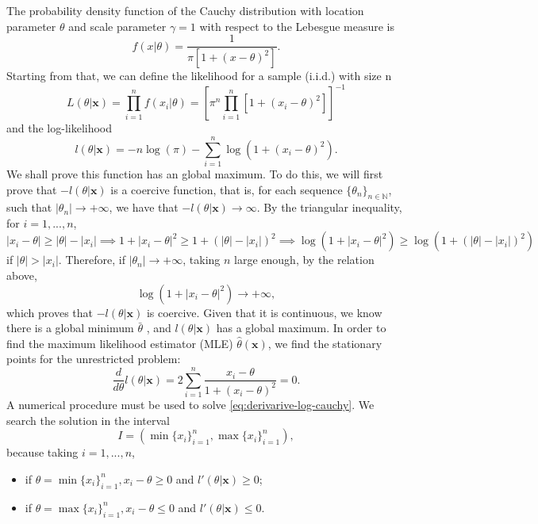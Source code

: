 \documentclass[a4paper,10pt, notitlepage]{report}
\theoremstyle{plain}
\newcommand{\bx}{\boldsymbol{x}} %
\begin{document}
The probability density function of the Cauchy distribution with location
parameter $\theta$ and scale parameter $\gamma=1$ with respect to the Lebesgue
measure is 
    \begin{equation}
        \label{eq:pdf-cauchy}
        f(x|\theta) = \frac{1}{\pi[1 + (x - \theta)^2]}.
    \end{equation} 
    Starting from that, we can define the likelihood for a sample (i.i.d.)
    with size n
    \begin{equation}
        \label{eq:likelihood-cauchy}
        L(\theta|\bx) = \prod_{i=1}^{n} f(x_i|\theta) = \left[\pi^{n}\prod_{i=1}^{n}[1 + (x_i - \theta)^2]\right]^{-1}
    \end{equation}
    and the log-likelihood
    \begin{equation}
        \label{eq:loglikelihood-cauchy}
        l(\theta|\bx) = -n\log(\pi) - \sum_{i=1}^{n}\log\left(1 + (x_i - \theta)^2\right).
    \end{equation}
    We shall prove this function has an global maximum. To do this, we will
    first prove that $-l(\theta|\bx)$ is a coercive function, that is, for each
    sequence $\{\theta_n\}_{n\in\mathbb{N}}$, such that $|\theta_n| \to +
    \infty$, we have that $-l(\theta|\bx) \to \infty$. By the triangular
    inequality, for $i=1,...,n$,
    $$|x_i - \theta| \ge |\theta| - |x_i| \implies 1 + |x_i - \theta|^2 \ge
    1 + (|\theta| - |x_i|)^2 \implies \log(1 + |x_i - \theta|^2) \ge
    \log(1 + (|\theta| - |x_i|)^2)$$
    if $|\theta| > |x_i|$.  Therefore, if $|\theta_n| \to + \infty$, taking
    $n$ large enough, by the relation above, 
    $$
    \log(1 + |x_i - \theta|^2) \to + \infty,
    $$
    which proves that $-l(\theta|\bx)$ is coercive. Given that it is continuous,
    we know there is a global minimum $\bar{\theta}$ \cite[Corolary
    1.2.8]{otimizacao}, and $l(\theta|\bx)$ has a global maximum. 
    In order to find the maximum likelihood estimator (MLE) $\hat{\theta}(\bx)$, we find the
    stationary points for the unrestricted problem: 
    \begin{equation}
        \label{eq:derivarive-log-cauchy}
        \frac{d}{d\theta}l(\theta|\bx) = 2\sum_{i=1}^{n} \frac{x_i-\theta}{1 + (x_i - \theta)^2} = 0.
    \end{equation}
    A numerical procedure must be used to solve
    \ref{eq:derivarive-log-cauchy}. We search the
    solution in the interval 
    $$I = (\min\{x_i\}_{i=1}^{n}, \max\{x_i\}_{i=1}^{n}),$$
    because taking $i=1,...,n$, 
    \begin{itemize}
        \item if $\theta = \min\{x_i\}_{i=1}^{n}, x_i -
        \theta \ge 0$ and $l'(\theta|\bx) \ge 0$;
        \item if $\theta =
        \max\{x_i\}_{i=1}^{n}, x_i - \theta \le 0$ and $l'(\theta|\bx) \le 0$.
    \end{itemize} 
\end{document}
